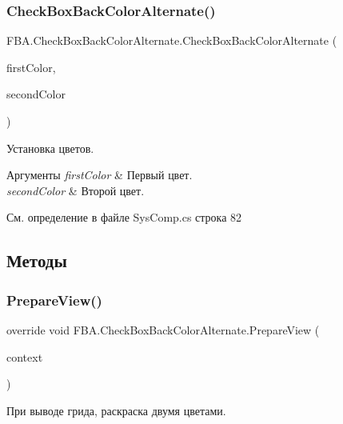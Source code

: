 \subsubsection{\texorpdfstring{Check\+Box\+Back\+Color\+Alternate()}{CheckBoxBackColorAlternate()}}
{\footnotesize\ttfamily F\+B\+A.\+Check\+Box\+Back\+Color\+Alternate.\+Check\+Box\+Back\+Color\+Alternate (\begin{DoxyParamCaption}\item[{Color}]{first\+Color,  }\item[{Color}]{second\+Color }\end{DoxyParamCaption})}



Установка цветов. 


\begin{DoxyParams}{Аргументы}
{\em first\+Color} & Первый цвет.\\
\hline
{\em second\+Color} & Второй цвет.\\
\hline
\end{DoxyParams}


См. определение в файле Sys\+Comp.\+cs строка 82



\subsection{Методы}
\mbox{\label{class_f_b_a_1_1_check_box_back_color_alternate_a424a015529c6046edf103f8e01f3b285}} 
\subsubsection{\texorpdfstring{Prepare\+View()}{PrepareView()}}
{\footnotesize\ttfamily override void F\+B\+A.\+Check\+Box\+Back\+Color\+Alternate.\+Prepare\+View (\begin{DoxyParamCaption}\item[{Source\+Grid.\+Cell\+Context}]{context }\end{DoxyParamCaption})\hspace{0.3cm}{\ttfamily [protected]}}



При выводе грида, раскраска двумя цветами. 


